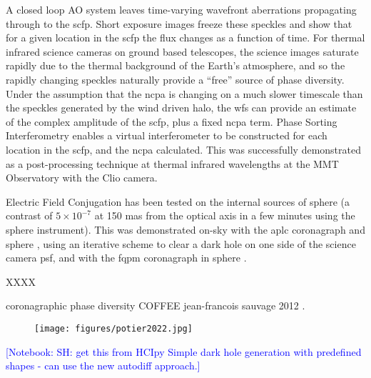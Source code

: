 \documentclass[letterpaper]{ar-1col}
\newcommand{\notebooksuggestion}[1]{\textcolor{blue}{[Notebook: #1]}}
\begin{document}
A closed loop AO system leaves time-varying wavefront aberrations propagating through to the \ac{scfp}.
%
Short exposure images freeze these speckles and show that for a given location in the \ac{scfp} the flux changes as a function of time.
%
For thermal infrared science cameras on ground based telescopes, the science images saturate rapidly due to the thermal background of the Earth's atmosphere, and so the rapidly changing speckles naturally provide a ``free'' source of phase diversity.
%
Under the assumption that the \ac{ncpa} is changing on a much slower timescale than the speckles generated by the wind driven halo, the \ac{wfs} can provide an estimate of the complex amplitude of the \ac{scfp}, plus a fixed \ac{ncpa} term.
%
Phase Sorting Interferometry \citep[PSI; ][]{Codona13} enables a virtual interferometer to be constructed for each location in the \ac{scfp}, and the \ac{ncpa} calculated.
%
This was successfully demonstrated as a post-processing technique at thermal infrared wavelengths at the MMT Observatory with the Clio camera.

Electric Field Conjugation has been tested on the internal sources of \ac{sphere} (a contrast of $5\times 10^{-7}$ at 150 mas from the optical axis in a few minutes using the \ac{sphere} instrument).
%
This was demonstrated on-sky with the \ac{aplc} coronagraph and \ac{sphere} \citep{Potier20,Potier22}, using an iterative scheme to clear a dark hole on one side of the science camera \ac{psf}, and with the \ac{fqpm} coronagraph in \ac{sphere} \citep{Galicher24}.

XXXX

coronagraphic phase diversity
COFFEE jean-francois sauvage 2012 \citep{Sauvage12}.

\begin{figure}[ht]
  \centering
  \texttt{[image: figures/potier2022.jpg]}
  \caption{}
  \label{fig:fpwfsclean}
\end{figure}

\notebooksuggestion{SH: get this from HCIpy Simple dark hole generation with predefined shapes - can use the new autodiff approach.}




\end{document}
